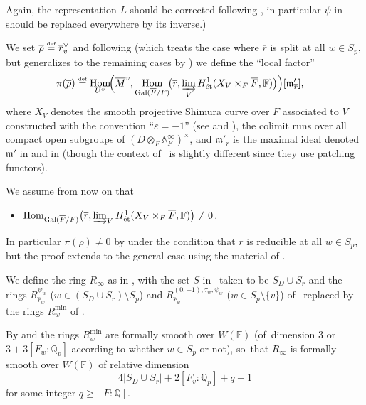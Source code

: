 \documentclass[JEP,XML,SOM,Unicode,NoFloatCountersInSection, NoEqCountersInSection,published]{cedram}
\let\ovl\overline
\newcommand{\defeq}{\stackrel{\textrm{\tiny{\upshape{def}}}}{=}}
\newcommand{\F}{\mathbb{F}}
\newcommand{\Q}{\mathbb{Q}}
\newcommand{\fm}{\mathfrak{m}}\let\m\fm
\newcommand{\Qp}{\mathbb{Q}_{p}}
\newcommand{\rbar}{\overline{r}}
\newcommand{\rhobar}{\overline{\rho}}
\DeclareMathOperator{\Gal}{Gal}
\DeclareMathOperator{\Hom}{Hom}
\theoremstyle{plain}
\theoremstyle{definition}
\begin{document}
Again, the representation $L$ should be corrected following \cite[Rem.\,8.1.3(i)]{BHHMS1}, in particular $\psi$ in \cite[\S 6.5]{EGS} should be replaced everywhere by {its inverse}.)

We set $\rhobar\defeq \rbar_v^\vee$ and following \cite[Eq.\,(3.3)]{BD} (which treats the case where $\rbar$ is split at all $w\in S_p$, but generalizes to the remaining cases by \cite[\S 6.5]{EGS}) we define the ``local factor''
\begin{align}
\label{eq:pi:rhobar}
\pi(\rhobar)&\defeq\Hom_{U^v}\!\Bigl(\!\,\ovl{M}^v, \Hom_{\Gal(\ovl F/F)}\!\bigl(\rbar, \varinjlim_{V}H^1_{\textup{ét}}({X}_{V} \times_F \overline F, \F)\bigr)\Bigr)[\fm'_{\rbar}],
\end{align}
where $X_V$ denotes the smooth projective Shimura curve over $F$ associated to $V$ constructed with the convention ``$\varepsilon=-1$'' (see \cite[\S 3.1]{BD} and \cite[\S 2]{BDJ}), the colimit runs over all compact open subgroups of $(D\otimes_F\mathbb{A}_F^{\infty})^\times$, and $\fm'_{\rbar}$ is the maximal ideal denoted $\fm'$ in \cite[\S 3.3]{BD} and in \cite[p.~50]{EGS} (though the context of \loccit~is slightly different since they use patching functors).

We assume from now on that
\begin{itemize}
\item $\Hom_{\Gal(\ovl F/F)}\bigl(\rbar, \varinjlim_{V}H^1_{\textup{ét}}({X}_{V} \times_F \overline F, \F)\bigr)\neq 0$.
\end{itemize}
In particular $\pi(\rhobar)\neq 0$ by \cite[Th.\,3.7.1]{BD} under the condition that $\rbar$ is reducible at all $w\in S_p$, but the proof extends to the general case using the material of \cite[\S 6.5]{EGS}.

We define the ring $R_\infty$ as in \cite[\S 8.1]{BHHMS1}, with the set $S$ in \loccit~taken to be $S_D \cup S_{\ovl r}$ and the rings $R^{\psi_w}_{\rbar_w}$ {($w \in (S_D \cup S_{\ovl r}) \setminus S_p$)} and $R_{\rbar_w}^{(0,-1),\tau_w,\psi_w}$ {($w\in S_p\setminus\{v\}$)} of \loccit~replaced by the rings $R_w^{\min}$ of \cite[\S 6.5]{EGS}.

By \cite[Th.\,7.2.1]{EGS} and \cite[Lem.\,3.4.1]{BD} the rings $R_w^{\min}$ are formally smooth over $W(\F)$ (of~dimension $3$ or $3+3[F_w:\Qp]$ according to whether $w\in S_p$ or not), so~that $R_\infty$ is formally smooth over $W(\F)$ of relative dimension
\[
4|S_D\cup S_{\ovl{r}}|+2[F_v:\Qp]+q-1
\]
for some integer $q\geq [F:\Q]$.
\end{document}
